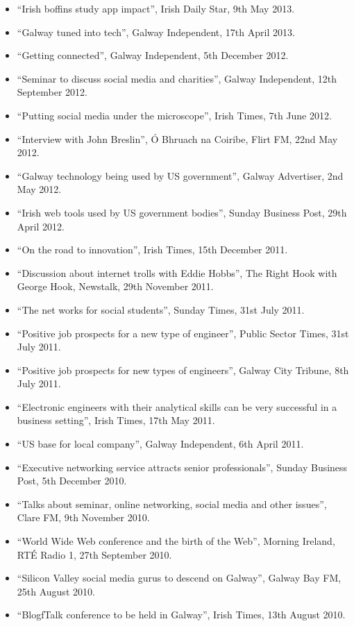 \documentclass[10pt,a4paper]{res} %
\begin{document}
\begin{resume}
{\begin{itemize}
\item ``Irish boffins study app impact'', Irish Daily Star, 9th May 2013.
\item ``Galway tuned into tech'', Galway Independent, 17th April 2013.
\item ``Getting connected'', Galway Independent, 5th December 2012.
\item ``Seminar to discuss social media and charities'', Galway Independent, 12th September 2012.
\item ``Putting social media under the microscope'', Irish Times, 7th June 2012.
\item ``Interview with John Breslin'', \'{O} Bhruach na Coiribe, Flirt FM, 22nd May 2012.
\item ``Galway technology being used by US government'', Galway Advertiser, 2nd May 2012.
\item ``Irish web tools used by US government bodies'', Sunday Business Post, 29th April 2012.
\item ``On the road to innovation'', Irish Times, 15th December 2011.
\item ``Discussion about internet trolls with Eddie Hobbs'', The Right Hook with George Hook, Newstalk, 29th November 2011.
\item ``The net works for social students'', Sunday Times, 31st July 2011.
\item ``Positive job prospects for a new type of engineer'', Public Sector Times, 31st July 2011.
\item ``Positive job prospects for new types of engineers'', Galway City Tribune, 8th July 2011.
\item ``Electronic engineers with their analytical skills can be very successful in a business setting'', Irish Times, 17th May 2011.
\item ``US base for local company'', Galway Independent, 6th April 2011.
\item ``Executive networking service attracts senior professionals'', Sunday Business Post, 5th December 2010.
\item ``Talks about seminar, online networking, social media and other issues'', Clare FM, 9th November 2010.
\item ``World Wide Web conference and the birth of the Web'', Morning Ireland, RT\'{E} Radio 1, 27th September 2010.
\item ``Silicon Valley social media gurus to descend on Galway'', Galway Bay FM, 25th August 2010.
\item ``BlogfTalk conference to be held in Galway'', Irish Times, 13th August 2010.

\end{itemize}}
\end{resume}
\end{document}
